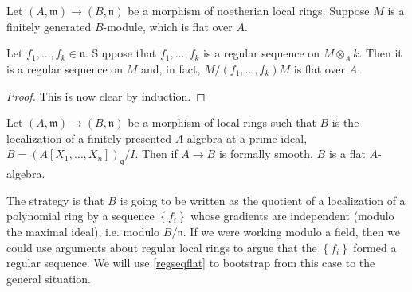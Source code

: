 \begin{corollary} \label{regseqflat} Let $(A, \mathfrak{m}) \to (B, \mathfrak{n})$ be a morphism
of noetherian local rings.
Suppose $M$ is a finitely generated $B$-module, which is flat over $A$.

Let $f_1, \dots, f_k \in \mathfrak{n}$. Suppose that $f_1, \dots, f_k$ is a
regular sequence on $M \otimes_A k$. Then it is a regular sequence on $M$ and,
in fact, $M/(f_1, \dots, f_k ) M$ is flat over $A$.
\end{corollary} 
\begin{proof} 
This is now clear by induction. 
\end{proof} 


\begin{theorem}\label{smoothflat1} Let $(A, \mathfrak{m}) \to (B, \mathfrak{n})$ be
a morphism of local  rings such that $B$ is the localization of
a finitely presented $A$-algebra at a prime
ideal, $B = (A[X_1, \dots, X_n])_{\mathfrak{q}}/I$. Then if $A \to B$ is formally smooth, $B$ is a flat $A$-algebra.
\end{theorem} 

The strategy is that $B$ is going to be written as the quotient of a
localization of a  polynomial
ring by a sequence $\left\{f_i\right\}$
whose gradients are independent (modulo the maximal ideal), i.e. modulo
$B/\mathfrak{n}$. 
If we were working modulo a field, then we could use arguments about regular
local rings to argue that the $\left\{f_i\right\}$ formed a regular
sequence. We will use \cref{regseqflat} to bootstrap from this case to the
general situation.

